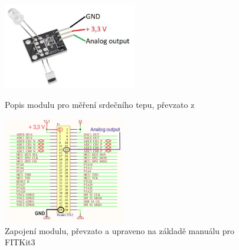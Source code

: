 \documentclass[a4paper, 11pt]{article}
\begin{document}
\begin{figure}[htbp]
  \begin{minipage}[b]{0.5\linewidth}
    \centering
    \includegraphics[width=220]{modulzapojeni.PNG}
    \caption{Popis modulu pro měření srdečního tepu, převzato z \cite{ZadaniPrezentace:web}}
  \end{minipage}
  \hspace{0.5cm}
  \begin{minipage}[b]{0.5\linewidth}
    \centering
    \includegraphics[width=200]{IMG_20191215_184411.png}
    \caption{Zapojení modulu, převzato a upraveno na základě manuálu pro FITKit3}
  \end{minipage}
\end{figure}
\end{document}
